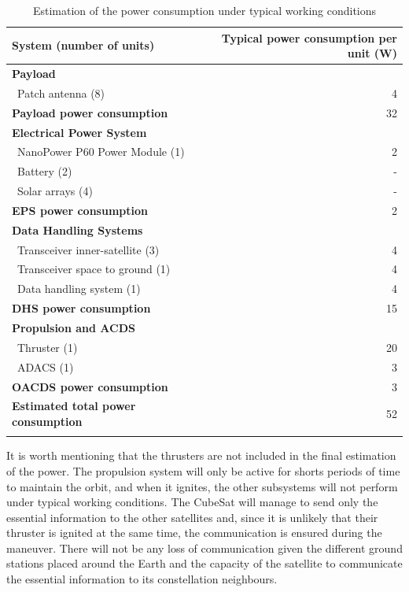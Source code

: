 \pagebreak
\begin{longtable}{| l | r | }
\hline
\rowcolor[gray]{0.80}	\textbf{System (number of units)} &  \textbf{Typical power consumption per unit (W)} \\
\hline
\endfirsthead

\rowcolor[gray]{0.85} \textbf{Payload} &  \\
	   ~Patch antenna (8) & 4 \\
	   \rowcolor[gray]{0.95} \textbf{Payload power consumption} & 32 \\
	   \hline
	\hline

\rowcolor[gray]{0.85} \textbf{Electrical Power System} &  \\
	   ~NanoPower P60 Power Module (1) & 2 \\
	   ~Battery (2) & - \\
	   ~Solar arrays (4) & -\\
	   \rowcolor[gray]{0.95} \textbf{EPS power consumption} & 2 \\
	   \hline
	\hline
	
\rowcolor[gray]{0.85} \textbf{Data Handling Systems} &  \\
	   ~Transceiver inner-satellite (3) & 4 \\
	   ~Transceiver space to ground (1) & 4 \\
	   ~Data handling system (1) & 4 \\
	   \rowcolor[gray]{0.95} \textbf{DHS power consumption} & 15 \\
	   \hline
	\hline
	
\rowcolor[gray]{0.85} \textbf{Propulsion and ACDS} &  \\
	   ~Thruster (1) & 20 \\
	   ~ADACS (1) & 3 \\
	   \rowcolor[gray]{0.95} \textbf{OACDS power consumption} & 3 \\
	   \hline
	\hline

\rowcolor[gray]{0.65} \textbf{Estimated total power consumption} & 52 \\

\caption{Estimation of the power consumption under typical working conditions}
\label{powerestimation}
\end{longtable}

It is worth mentioning that the thrusters are not included in the final estimation of the power. The propulsion system will only be active for shorts periods of time to maintain the orbit, and when it ignites, the other subsystems will not perform under typical working conditions. The CubeSat will manage to send only the essential information to the other satellites and, since it is unlikely that their thruster is ignited at the same time, the communication is ensured during the maneuver. There will not be any loss of communication given the different ground stations placed around the Earth and the capacity of the satellite to communicate the essential information to its constellation neighbours.


